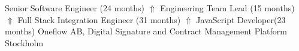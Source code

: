 {Senior Software Engineer (24 months) \(\Uparrow\) Engineering Team Lead (15 months) \(\Uparrow\) Full Stack Integration Engineer (31 months)  \(\Uparrow\) JavaScript Developer(23 months)}
{Oneflow AB,  Digital Signature and Contract Management Platform}
{Stockholm \Large{}}{}
{
}
